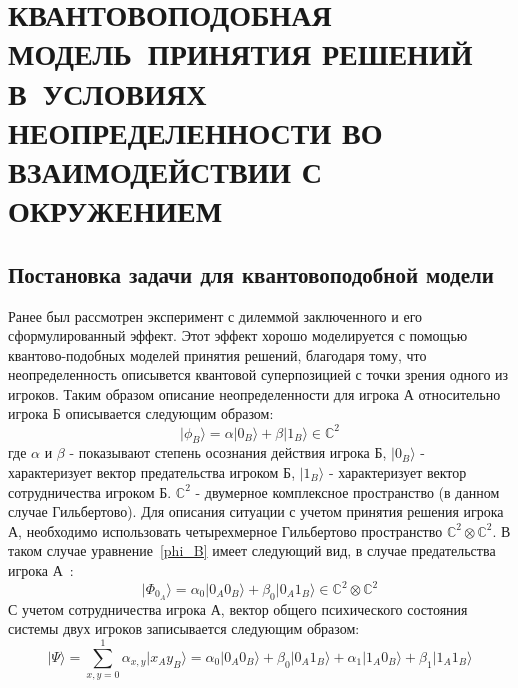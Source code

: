 \chapter{КВАНТОВОПОДОБНАЯ МОДЕЛЬ~ПРИНЯТИЯ РЕШЕНИЙ В~УСЛОВИЯХ НЕОПРЕДЕЛЕННОСТИ ВО ВЗАИМОДЕЙСТВИИ С ОКРУЖЕНИЕМ}
\section{Постановка задачи для квантовоподобной модели}

Ранее был рассмотрен эксперимент с дилеммой заключенного и его сформулированный эффект.
Этот эффект хорошо моделируется с помощью квантово-подобных моделей принятия решений, благодаря
тому, что неопределенность описывется квантовой суперпозицией с точки зрения одного из игроков.
Таким образом описание неопределенности для игрока А относительно игрока Б описывается следующим образом:
\begin{equation}\label{phi_B}
    \vert \phi_{B} \rangle = \alpha \vert 0_{B} \rangle + \beta \vert 1_{B} \rangle \in \mathbb{C}^{2} %
\end{equation}
где $\alpha$ и $\beta$ - показывают степень осознания действия игрока Б, $\vert 0_{B} \rangle$ - характеризует
вектор предательства игроком Б, $\vert 1_{B} \rangle$ - характеризует вектор сотрудничества игроком Б.
$\mathbb{C}^{2}$ - двумерное комплексное пространство (в данном случае Гильбертово).
Для описания ситуации с учетом принятия решения игрока А, необходимо использовать четырехмерное Гильбертово
пространство $\mathbb{C}^{2} \otimes \mathbb{C}^{2}$.
В таком случае уравнение~\eqref{phi_B} имеет следующий вид, в случае предательства игрока А~\citep{asano2011quantum}:
\begin{equation}
    \vert \Phi_{0_{A}} \rangle = \alpha_{0} \vert 0_{A} 0_{B} \rangle + \beta_{0} \vert 0_{A} 1_{B} \rangle \in \mathbb{C}^{2} \otimes \mathbb{C}^{2}
\end{equation}
С учетом сотрудничества игрока А, вектор общего психического состояния системы двух игроков записывается
следующим образом:
\begin{equation}
    \vert \Psi \rangle = \sum_{x,y=0}^{1} \alpha_{x,y} \vert x_{A} y_{B} \rangle =
    \alpha_{0} \vert 0_{A} 0_{B} \rangle + \beta_{0} \vert 0_{A} 1_{B} \rangle +
    \alpha_{1} \vert 1_{A} 0_{B} \rangle + \beta_{1} \vert 1_{A} 1_{B} \rangle
\end{equation}

